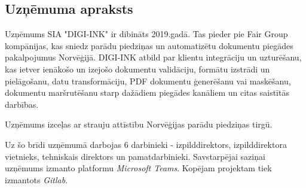 \subsection{Uzņēmuma apraksts}
Uzņēmums SIA "DIGI-INK" ir dibināts 2019.gadā. Tas pieder pie Fair Group kompānijas, kas sniedz parādu piedziņas un automatizētu dokumentu piegādes pakalpojumus Norvēģijā.
DIGI-INK atbild par klientu integrāciju un uzturēšanu, kas ietver ienākošo un izejošo dokumentu validāciju, formātu izstrādi un pielāgošanu, datu transformāciju, PDF dokumentu ģenerēšanu vai maskēšanu, dokumentu maršrutēšanu starp dažādiem piegādes kanāliem un citas saistītās darbības.
\par Uzņēmums izceļas ar strauju attīstību Norvēģijas parādu piedziņas tirgū. %
\par Uz šo brīdi uzņēmumā darbojas 6 darbinieki - izpilddirektors, izpilddirektora vietnieks, tehniskais direktors un pamatdarbinieki. Savstarpējai saziņai uzņēmums izmanto platformu \textit{Microsoft Teams}. Kopējam projektam tiek izmantots \textit{Gitlab}.